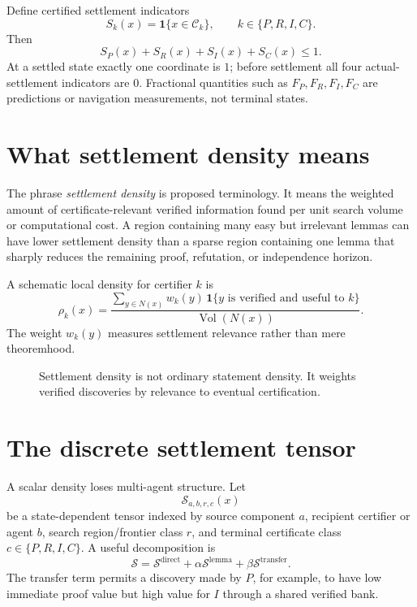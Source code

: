 \documentclass[11pt]{article}
\newcommand{\Sset}{\mathcal C}
\begin{document}
Define certified settlement indicators
\[
S_k(x)=\mathbf 1\{x\in\Sset_k\},\qquad k\in\{P,R,I,C\}.
\]
Then
\[
\boxed{S_P(x)+S_R(x)+S_I(x)+S_C(x)\le 1.}
\]
At a settled state exactly one coordinate is $1$; before settlement all four actual-settlement indicators are $0$. Fractional quantities such as $F_P,F_R,F_I,F_C$ are predictions or navigation measurements, not terminal states.

\section{What settlement density means}
The phrase \emph{settlement density} is proposed terminology. It means the weighted amount of certificate-relevant verified information found per unit search volume or computational cost. A region containing many easy but irrelevant lemmas can have lower settlement density than a sparse region containing one lemma that sharply reduces the remaining proof, refutation, or independence horizon.

A schematic local density for certifier $k$ is
\[
\rho_k(x)=\frac{\sum_{y\in N(x)}w_k(y)\,\mathbf 1\{y\text{ is verified and useful to }k\}}{\operatorname{Vol}(N(x))}.
\]
The weight $w_k(y)$ measures settlement relevance rather than mere theoremhood.

\begin{figure}[ht]
\centering
{}
\caption{Settlement density is not ordinary statement density. It weights verified discoveries by relevance to eventual certification.}
\end{figure}

\section{The discrete settlement tensor}
A scalar density loses multi-agent structure. Let
\[
\mathcal S_{a,b,r,c}(x)
\]
be a state-dependent tensor indexed by source component $a$, recipient certifier or agent $b$, search region/frontier class $r$, and terminal certificate class $c\in\{P,R,I,C\}$. A useful decomposition is
\[
\mathcal S=\mathcal S^{\mathrm{direct}}+\alpha\mathcal S^{\mathrm{lemma}}+\beta\mathcal S^{\mathrm{transfer}}.
\]
The transfer term permits a discovery made by $P$, for example, to have low immediate proof value but high value for $I$ through a shared verified bank.
\end{document}
